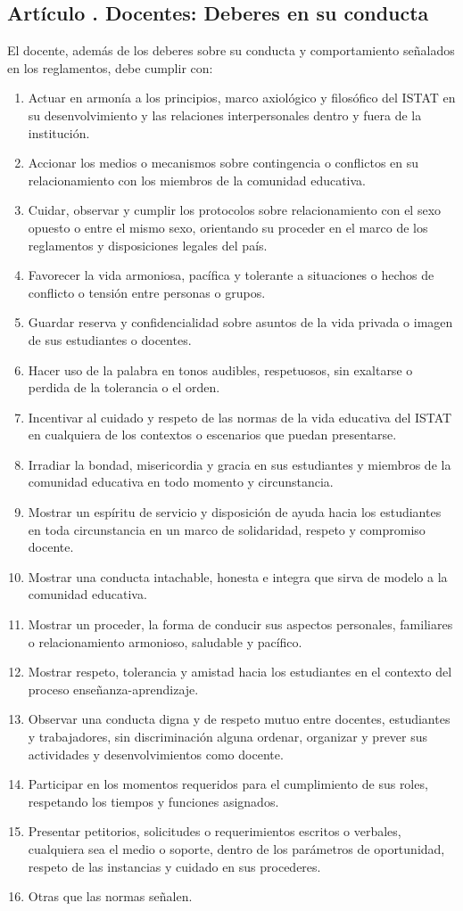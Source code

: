 \subsection{Artículo . Docentes: Deberes en su conducta}
\addtocounter{ns}{1}
El docente, además de los deberes sobre su conducta y comportamiento señalados en los reglamentos, debe cumplir con: 
\begin{enumerate}
\item Actuar en armonía a los principios, marco axiológico y filosófico del ISTAT en su desenvolvimiento y las relaciones interpersonales dentro y fuera de la institución. 
\item Accionar los medios o mecanismos sobre contingencia o conflictos en su relacionamiento con los miembros de la comunidad educativa. 
\item Cuidar, observar y cumplir los protocolos sobre relacionamiento con el sexo opuesto o entre el mismo sexo, orientando su proceder en el marco de los reglamentos y disposiciones legales del país. 
\item Favorecer la vida armoniosa, pacífica y tolerante a situaciones o hechos de conflicto o tensión entre personas o grupos. 
\item Guardar reserva y confidencialidad sobre asuntos de la vida privada o imagen de sus estudiantes o docentes. 
\item Hacer uso de la palabra en tonos audibles, respetuosos, sin exaltarse o perdida de la tolerancia o el orden. 
\item Incentivar al cuidado y respeto de las normas de la vida educativa del ISTAT en cualquiera de los contextos o escenarios que puedan presentarse. 
\item Irradiar la bondad, misericordia y gracia en sus estudiantes y miembros de la comunidad educativa en todo momento y circunstancia. 
\item Mostrar un espíritu de servicio y disposición de ayuda hacia los estudiantes en toda circunstancia en un marco de solidaridad, respeto y compromiso docente. 
\item Mostrar una conducta intachable, honesta e integra que sirva de modelo a la comunidad educativa. 
\item Mostrar un proceder, la forma de conducir sus aspectos personales, familiares o relacionamiento armonioso, saludable y pacífico. 
\item Mostrar respeto, tolerancia y amistad hacia los estudiantes en el contexto del proceso enseñanza-aprendizaje. 
\item Observar una conducta digna y de respeto mutuo entre docentes, estudiantes y trabajadores, sin discriminación alguna ordenar, organizar y prever sus actividades y desenvolvimientos como docente. 
\item Participar en los momentos requeridos para el cumplimiento de sus roles, respetando los tiempos y funciones asignados. 
\item Presentar petitorios, solicitudes o requerimientos escritos o verbales, cualquiera sea el medio o soporte, dentro de los parámetros de oportunidad, respeto de las instancias y cuidado en sus procederes. 
\item Otras que las normas señalen. 
\end{enumerate}
